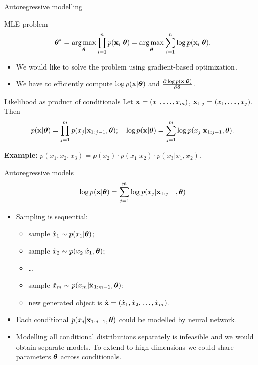\begin{frame}{Autoregressive modelling}
    \begin{block}{MLE problem}
	    \vspace{-0.4cm}
	    \[
	        \boldsymbol{\theta}^* = \operatorname*{arg\,max}_{\boldsymbol{\theta}} \prod_{i=1}^n p(\mathbf{x}_i | \boldsymbol{\theta}) = \operatorname*{arg\,max}_{\boldsymbol{\theta}} \sum_{i=1}^n \log p(\mathbf{x}_i | \boldsymbol{\theta}).
	    \]
	    \vspace{-0.5cm}
    \end{block}
    \begin{itemize}
        \item We would like to solve the problem using gradient-based optimization.
        \item We have to efficiently compute $\log p(\mathbf{x} | \boldsymbol{\theta})$ and $\frac{\partial \log p(\mathbf{x} | \boldsymbol{\theta})}{\partial \boldsymbol{\theta}}$.
    \end{itemize}
    \begin{block}{Likelihood as product of conditionals}
    Let $\mathbf{x} = (x_1, \dots, x_m)$, $\mathbf{x}_{1:j} = (x_1, \dots, x_j)$. Then 
    \[
        p(\mathbf{x} | \boldsymbol{\theta}) = \prod_{j=1}^m p(x_j | \mathbf{x}_{1:j - 1}, \boldsymbol{\theta}); \quad 
        \log p(\mathbf{x} | \boldsymbol{\theta}) = \sum_{j=1}^m \log p(x_j | \mathbf{x}_{1:j - 1}, \boldsymbol{\theta}).
    \]
    \end{block}
	\textbf{Example:} $p(x_1, x_2, x_3) = p(x_2) \cdot p(x_1 | x_2) \cdot p(x_3 | x_1, x_2)$.
\end{frame}
\begin{frame}{Autoregressive models}
    \[
    \log p(\mathbf{x}| \boldsymbol{\theta}) = \sum_{j=1}^m \log p(x_j | \mathbf{x}_{1:j - 1}, \boldsymbol{\theta})
    \]
    \begin{itemize}
	    \item Sampling is sequential:
	    \begin{itemize}
    		\item sample $\hat{x}_1 \sim p(x_1 | \boldsymbol{\theta})$;
    		\item sample $\hat{x}_2 \sim p(x_2 | \hat{x}_1, \boldsymbol{\theta})$;
    		\item \dots
    		\item sample $\hat{x}_m \sim p(x_m | \hat{\mathbf{x}}_{1:m-1}, \boldsymbol{\theta})$;
    		\item new generated object is $\hat{\mathbf{x}} = (\hat{x}_1, \hat{x}_2, \dots, \hat{x}_m)$.
    	\end{itemize}
        \item Each conditional $p(x_j | \mathbf{x}_{1:j - 1}, \boldsymbol{\theta})$ could be modelled by neural network.
        \item Modelling all conditional distributions separately is infeasible and we would obtain separate models. To extend to high dimensions we could share parameters $\boldsymbol{\theta}$ across conditionals.

    \end{itemize}
\end{frame}

